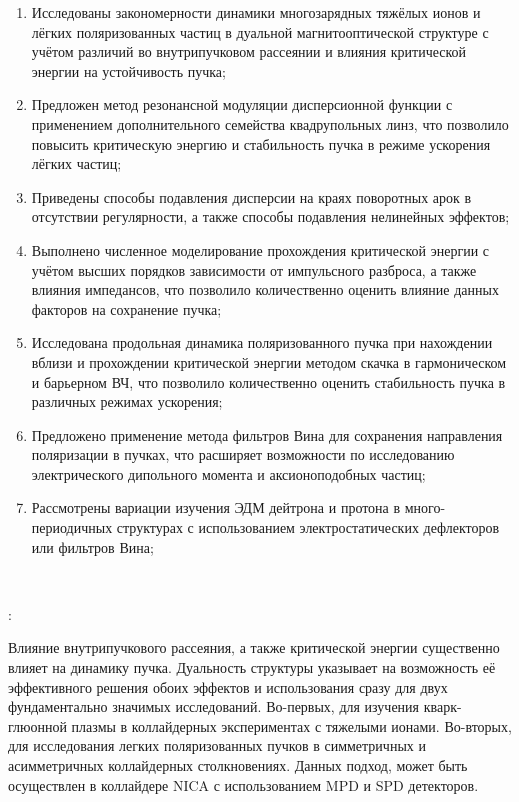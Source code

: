 \begin{enumerate}[beginpenalty=10000] %
    \item	Исследованы закономерности динамики многозарядных тяжёлых ионов и лёгких поляризованных частиц в дуальной магнитооптической структуре с учётом различий во внутрипучковом рассеянии и влияния критической энергии на устойчивость пучка;
  \item 	Предложен метод резонансной модуляции дисперсионной функции с применением дополнительного семейства квадрупольных линз, что позволило повысить критическую энергию и стабильность пучка в режиме ускорения лёгких частиц;
  \item	Приведены способы подавления дисперсии на краях поворотных арок в отсутствии регулярности, а также способы подавления нелинейных эффектов;
  \item 	Выполнено численное моделирование прохождения критической энергии с учётом высших порядков зависимости от импульсного разброса, а также влияния импедансов, что позволило количественно оценить влияние данных факторов на сохранение пучка;
  \item	Исследована продольная динамика поляризованного пучка при нахождении вблизи и прохождении критической энергии методом скачка в гармоническом и барьерном ВЧ, что позволило количественно оценить стабильность пучка в различных режимах ускорения;
  \item	Предложено применение метода фильтров Вина для сохранения направления поляризации в пучках, что расширяет возможности по исследованию электрического дипольного момента и аксионоподобных частиц;
  \item	Рассмотрены вариации изучения ЭДМ дейтрона и протона в много-периодичных структурах с использованием электростатических дефлекторов или фильтров Вина;
\end{enumerate}
~\\
\par {\influence}:
\par Влияние внутрипучкового рассеяния, а также критической энергии существенно влияет на динамику пучка. Дуальность структуры указывает на возможность её эффективного решения обоих эффектов и использования сразу для двух фундаментально значимых исследований. Во-первых, для изучения кварк-глюонной плазмы в коллайдерных экспериментах с тяжелыми ионами. Во-вторых, для исследования легких поляризованных пучков в симметричных и асимметричных коллайдерных столкновениях. Данных подход, может быть осуществлен в коллайдере NICA с использованием MPD и SPD детекторов.

